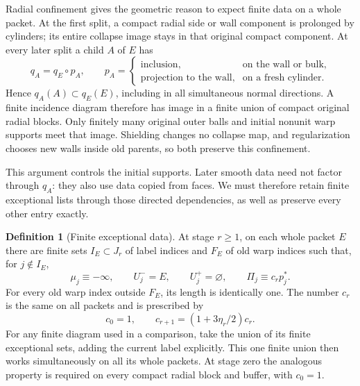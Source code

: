 \documentclass[11pt]{article}
\numberwithin{equation}{section}
\theoremstyle{definition}
\newtheorem{definition}[theorem]{Definition}
\theoremstyle{remark}
\begin{document}
Radial confinement gives the geometric reason to expect finite data on
a whole packet. At the first split, a compact radial side or wall
component is prolonged by cylinders; its entire collapse image stays
in that original compact component. At every later split a child $A$
of $E$ has
\begin{equation}\label{countable:collapse-recursion}
 q_A=q_E\circ p_A,\qquad
 p_A=\begin{cases}
 \text{inclusion},&\text{on the wall or bulk},\\
 \text{projection to the wall},&\text{on a fresh cylinder}.
 \end{cases}
\end{equation}
Hence $q_A(A)\subset q_E(E)$, including in all simultaneous normal
directions. A finite incidence diagram therefore has image in a finite
union of compact original radial blocks. Only finitely many original
outer balls and initial nonunit warp supports meet that image.
Shielding changes no collapse map, and regularization chooses new
walls inside old parents, so both preserve this confinement.

This argument controls the initial supports. Later smooth data need
not factor through $q_A$: they also use data copied from faces. We
must therefore retain finite exceptional lists through those directed
dependencies, as well as preserve every other entry exactly.

\begin{definition}[Finite exceptional data]\label{countable:finite-data}
At stage $r\ge1$, on each whole packet $E$ there are finite sets
$I_E\subset J_r$ of label indices and $F_E$ of old warp indices such
that, for $j\notin I_E$,
\begin{equation}\label{countable:passive}
 \mu_j\equiv-\infty,\qquad U_j^-=E,\qquad U_j^+=\varnothing,
 \qquad \Pi_j\equiv c_rp_j^*.
\end{equation}
For every old warp index outside $F_E$, its length is identically one.
The number $c_r$ is the same on all packets and is prescribed by
\begin{equation}\label{countable:passive-multiplier}
 c_0=1,\qquad c_{r+1}=(1+3\eta_r/2)c_r.
\end{equation}
For any finite diagram used in a comparison, take the union of its
finite exceptional sets, adding the current label explicitly. This
one finite union then works simultaneously on all its whole packets.
At stage zero the analogous property is required on every compact
radial block and buffer, with $c_0=1$.
\end{definition}
\end{document}
